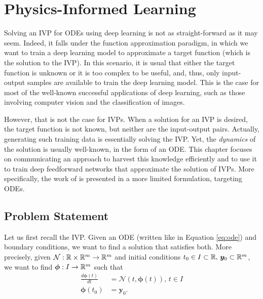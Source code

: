 \chapter{Physics-Informed Learning}\label{ch:pinn}

Solving an \gls{IVP} for \gls{ODE}s using deep learning is not as straight-forward as it may seem.
Indeed, it falls under the function approximation paradigm, in which we want to train a deep learning model to approximate a target function (which is the solution to the \gls{IVP}).
In this scenario, it is usual that either the target function is unknown or it is too complex to be useful, and, thus, only input-output samples are available to train the deep learning model.
This is the case for most of the well-known successful applications of deep learning, such as those involving computer vision and the classification of images. %

However, that is not the case for \glspl{IVP}.
When a solution for an \gls{IVP} is desired, the target function is not known, but neither are the input-output pairs.
Actually, generating such training data is essentially solving the \gls{IVP}.
Yet, the \emph{dynamics} of the solution is usually well-known, in the form of an \gls{ODE}.
This chapter focuses on communicating an approach to harvest this knowledge efficiently and to use it to train deep feedforward networks that approximate the solution of \glspl{IVP}.
More specifically, the work of \textcite{Raissi2019} is presented in a more limited formulation, targeting \gls{ODE}s\footnotemark.

\section{Problem Statement}\label{sec:pinn-problem}

Let us first recall the \gls{IVP}.
Given an \gls{ODE} (written like in Equation \eqref{eq:ode}) and boundary conditions, we want to find a solution that satisfies both.
More precisely, given $\mathcal{N}:\mathbb{R}\times \mathbb{R}^m\to \mathbb{R}^{m}$ and initial conditions $t_0\in I\subset \mathbb{R},\,\bm{y}_0\subset \mathbb{R}^{m}$, we want to find $\bm{\phi}:I\to \mathbb{R}^{m}$ such that
\begin{align*}
    \frac{d \bm{\phi}(t)}{d t} &= \mathcal{N}\left( t, \bm{\phi}(t) \right),\,t\in I \\
    \bm{\phi}(t_0) &= \bm{y}_0
.\end{align*}

